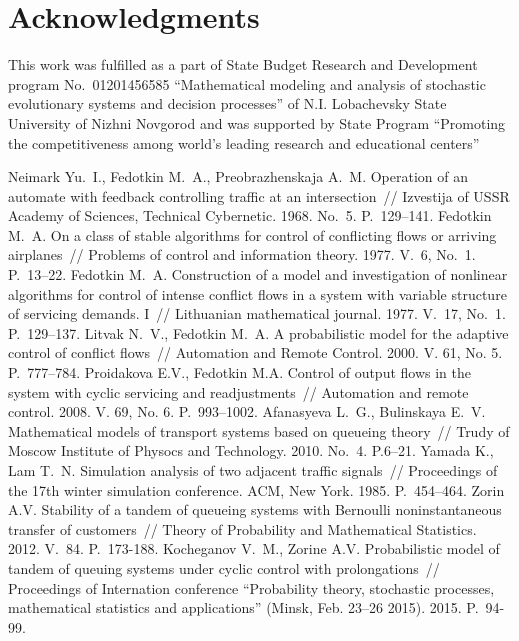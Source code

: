 \documentclass[10pt]{article}
\begin{document}
\section{Acknowledgments}

This work was fulfilled as a part of State Budget Research and Development program No.~01201456585
``Mathematical modeling and analysis of stochastic evolutionary systems and decision processes'' of
N.I. Lobachevsky State University of Nizhni Novgorod and was supported by State Program ``Promoting
the competitiveness among world's leading research and educational centers''


\begin{thebibliography}{99}
 Neimark Yu.~I., Fedotkin M.~A., Preobrazhenskaja A.~M. Operation of an automate
  with feedback controlling traffic at an intersection~// Izvestija of USSR Academy of Sciences,
  Technical Cybernetic. 1968. No.~5. P.~129--141.
  Fedotkin M.~A. On a class of stable algorithms for control of conflicting flows or arriving
  airplanes~// Problems of control and information theory. 1977. V.~6, No.~1. P.~13--22.
  Fedotkin M.~A. Construction of a model and investigation of nonlinear algorithms for control of
  intense conflict flows in a system with variable structure of servicing demands. I~// Lithuanian
  mathematical journal. 1977. V.~17, No.~1. P.~129--137.
%
  Litvak N.~V., Fedotkin M.~A. A probabilistic model for the
  adaptive control of conflict flows~// Automation and Remote Control. 2000. V. 61, No. 5. P.~777--784.
%
  Proidakova E.V., Fedotkin M.A. Control of output flows in the system with cyclic servicing and
  readjustments~// Automation and remote control. 2008. V. 69, No. 6. P.~993--1002.
%
  Afanasyeva L.~G., Bulinskaya E.~V. Mathematical models of transport systems based on queueing
  theory~// Trudy of Moscow Institute of Physocs and Technology. 2010. No.~4. P.6--21. 
  Yamada K., Lam T.~N. Simulation analysis of two adjacent traffic signals~// Proceedings of the
  17th winter simulation conference. ACM, New York. 1985. P.~454--464.
%
  Zorin A.V. Stability of a tandem of queueing systems with Bernoulli noninstantaneous transfer of
  customers~// Theory of Probability and Mathematical Statistics. 2012. V.~84. P.~173-188.
  Kocheganov V.~M., Zorine A.V. Probabilistic model of tandem of queuing systems under cyclic
  control with prolongations~// Proceedings of Internation conference ``Probability theory, stochastic processes, mathematical statistics
  and applications'' (Minsk, Feb. 23--26 2015). 2015. P.~94-99.
\end{thebibliography}
\end{document}
